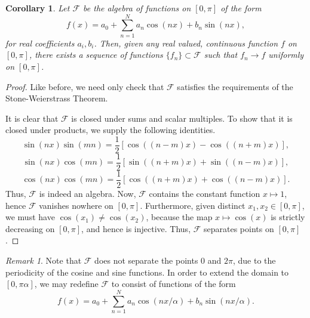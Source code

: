 \documentclass[11pt]{article}
\newtheorem{corollary}{Corollary}[theorem]
\theoremstyle{definition}
\theoremstyle{remark}
\newtheorem*{remark}{Remark}
\begin{document}
    \begin{corollary}
        Let $\mathscr{F}$ be the algebra of functions on $[0, \pi]$ of the form \[
            f(x) = a_0 + \sum_{n = 1}^N a_n \cos(nx) + b_n\sin(nx),
        \] for real coefficients $a_i, b_i$. Then, given any real valued, continuous
        function $f$ on $[0, \pi]$, there exists a sequence of functions $\{f_n\}
        \subset \mathscr{F}$ such that $f_n \to f$ uniformly on $[0,
        \pi]$.
    \end{corollary}
    \begin{proof}
        Like before, we need only check that $\mathscr{F}$ satisfies the requirements
        of the Stone-Weierstrass Theorem.

        It is clear that $\mathscr{F}$ is closed under sums and scalar multiples. To
        show that it is closed under products, we supply the following identities. \[
            \sin(nx)\sin(mn) = \frac{1}{2}\left[\cos((n - m)x) - \cos((n + m)x)
            \right],
        \] \[
            \sin(nx)\cos(mn) = \frac{1}{2}\left[\sin((n + m)x) + \sin((n - m)x)
            \right],
        \] \[
            \cos(nx)\cos(mn) = \frac{1}{2}\left[\cos((n + m)x) + \cos((n - m)x)
            \right].
        \] Thus, $\mathscr{F}$ is indeed an algebra. Now, $\mathscr{F}$ contains the
        constant function $x \mapsto 1$, hence $\mathscr{F}$ vanishes nowhere on
        $[0, \pi]$. Furthermore, given distinct $x_1, x_2 \in [0, \pi]$, we must have
        $\cos(x_1) \neq \cos(x_2)$, because the map $x \mapsto \cos(x)$ is strictly
        decreasing on $[0, \pi]$, and hence is injective. Thus, $\mathscr{F}$
        separates points on $[0, \pi]$.
    \end{proof}
    \begin{remark}
        Note that $\mathscr{F}$ does not separate the points $0$ and $2\pi$, due to
        the periodicity of the cosine and sine functions. In order to extend the
        domain to $[0, \pi\alpha]$, we may redefine $\mathscr{F}$ to consist of
        functions of the form \[
            f(x) = a_0 + \sum_{n = 1}^N a_n \cos(nx / \alpha) + b_n\sin(nx/\alpha).
        \] 
    \end{remark}
\end{document}
